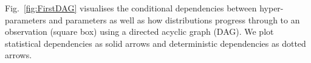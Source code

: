 Fig.~\ref{fig:FirstDAG} visualises the conditional dependencies between hyper-parameters and parameters as well as how distributions progress through to an observation (square box) using a directed acyclic graph (DAG).
We plot statistical dependencies as solid arrows and deterministic dependencies as dotted arrows.



%


%


